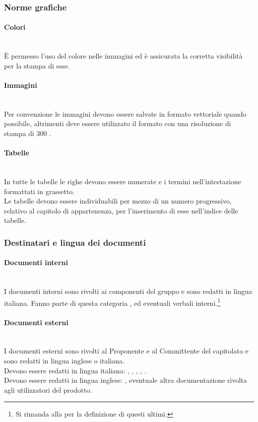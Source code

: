 \subsubsection{Norme grafiche}

\paragraph{Colori}\mbox{}\\
\`{E} permesso l'uso del colore nelle immagini ed è assicurata la corretta visibilità per la stampa di esse.

\paragraph{Immagini}\mbox{}\\
Per convenzione le immagini devono essere salvate in formato vettoriale  quando possibile, altrimenti deve essere utilizzato il formato  con una risoluzione di stampa di 300 .

\paragraph{Tabelle}\mbox{}\\
In tutte le tabelle le righe devono essere numerate e i termini nell'intestazione formattati in grassetto.
\\
Le tabelle devono essere individuabili per mezzo di un numero progressivo, relativo al capitolo di appartenenza, per l'inserimento di esse nell'indice delle tabelle.

\subsubsection{Destinatari e lingua dei documenti}
\paragraph{Documenti interni}\mbox{}\\
I documenti interni sono rivolti ai componenti del gruppo e sono redatti in lingua italiana. Fanno parte di questa categoria \NormeDiProgetto, \StudioDiFattibilita{} ed eventuali verbali interni.\footnote[1]{Si rimanda alla  per la definizione di questi ultimi.}

\paragraph{Documenti esterni}\mbox{}\\
I documenti esterni sono rivolti al Proponente e al Committente del capitolato e sono redatti in lingua inglese o italiana.\\
Devono essere redatti in lingua italiana: \PianoDiProgetto, \PianoDiQualifica, \SpecificaTecnica, \DefinizioneDiProdotto, \Glossario.\\
Devono essere redatti in lingua inglese: \ManualeUtente, eventuale altra documentazione rivolta agli utilizzatori del prodotto.

